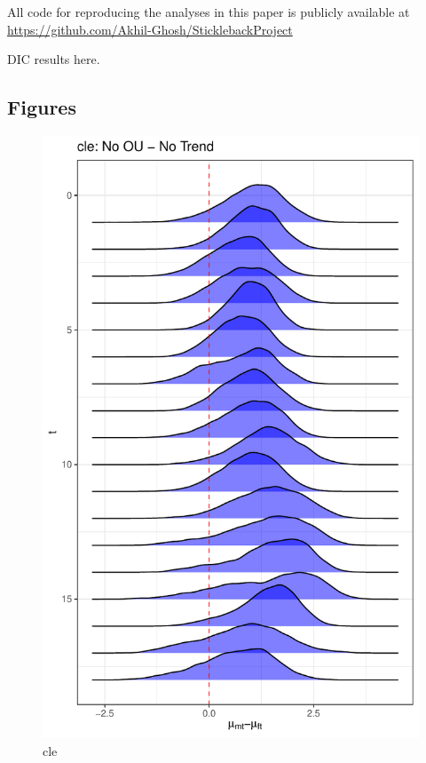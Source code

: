 \documentclass[
  12pt,
]{article}
\begin{document}
All code for reproducing the analyses in this paper is publicly
available at \url{https://github.com/Akhil-Ghosh/SticklebackProject}

DIC results here.

\hypertarget{figures}{%
\subsection{Figures}\label{figures}}

\begin{figure}

{\centering \includegraphics[width=0.9\linewidth]{../Figures/cle/mu_diff} 

}

\caption{cle}\label{fig:unnamed-chunk-7}
\end{figure}
\end{document}
